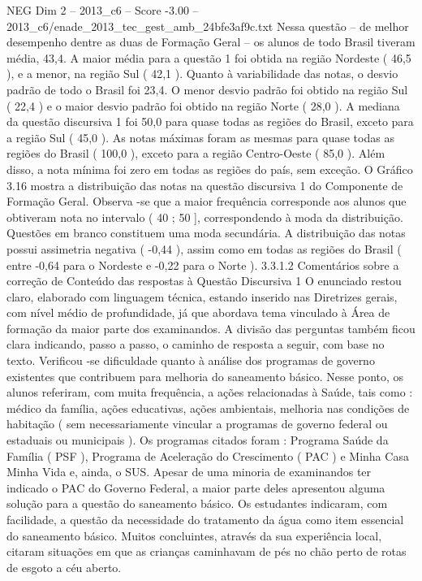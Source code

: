 \begin{textsample}{NEG Dim 2 – 2013\_c6 – Score -3.00 – 2013\_c6/enade\_2013\_tec\_gest\_amb\_24bfe3af9c.txt}
Nessa questão – de melhor desempenho dentre as duas de Formação Geral – os alunos de todo Brasil tiveram média, 43,4.
A maior média para a questão 1 foi obtida na região Nordeste ( 46,5 ), e a menor, na região Sul ( 42,1 ).
Quanto à variabilidade das notas, o desvio padrão de todo o Brasil foi 23,4.
O menor desvio padrão foi obtido na região Sul ( 22,4 ) e o maior desvio padrão foi obtido na região Norte ( 28,0 ).
A mediana da questão discursiva 1 foi 50,0 para quase todas as regiões do Brasil, exceto para a região Sul ( 45,0 ).
As notas máximas foram as mesmas para quase todas as regiões do Brasil ( 100,0 ), exceto para a região Centro-Oeste ( 85,0 ).
Além disso, a nota mínima foi zero em todas as regiões do país, sem exceção.
O Gráfico 3.16 mostra a distribuição das notas na questão discursiva 1 do Componente de Formação Geral.
Observa -se que a maior frequência corresponde aos alunos que obtiveram nota no intervalo ( 40 ; 50 ], correspondendo à moda da distribuição.
Questões em branco constituem uma moda secundária.
A distribuição das notas possui assimetria negativa ( -0,44 ), assim como em todas as regiões do Brasil ( entre -0,64 para o Nordeste e -0,22 para o Norte ). 3.3.1.2 Comentários sobre a correção de Conteúdo das respostas à Questão Discursiva 1 O enunciado restou claro, elaborado com linguagem técnica, estando inserido nas Diretrizes gerais, com nível médio de profundidade, já que abordava tema vinculado à Área de formação da maior parte dos examinandos.
A divisão das perguntas também ficou clara indicando, passo a passo, o caminho de resposta a seguir, com base no texto.
Verificou -se dificuldade quanto à análise dos programas de governo existentes que contribuem para melhoria do saneamento básico.
Nesse ponto, os alunos referiram, com muita frequência, a ações relacionadas à Saúde, tais como : médico da família, ações educativas, ações ambientais, melhoria nas condições de habitação ( sem necessariamente vincular a programas de governo federal ou estaduais ou municipais ).
Os programas citados foram : Programa Saúde da Família ( PSF ), Programa de Aceleração do Crescimento ( PAC ) e Minha Casa Minha Vida e, ainda, o SUS.
Apesar de uma minoria de examinandos ter indicado o PAC do Governo Federal, a maior parte deles apresentou alguma solução para a questão do saneamento básico.
Os estudantes indicaram, com facilidade, a questão da necessidade do tratamento da água como item essencial do saneamento básico.
Muitos concluintes, através da sua experiência local, citaram situações em que as crianças caminhavam de pés no chão perto de rotas de esgoto a céu aberto.

\end{textsample}
